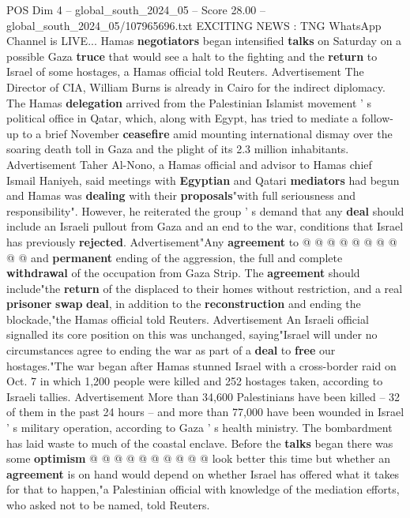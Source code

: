 \begin{textsample}{POS Dim 4 – global\_south\_2024\_05 – Score 28.00 – global\_south\_2024\_05/107965696.txt}  \label{ex:f4_pos_201}
EXCITING NEWS : TNG WhatsApp Channel is LIVE...
Hamas \textbf{negotiators} began intensified \textbf{talks} on Saturday on a possible Gaza \textbf{truce} that would see a halt to the fighting and the \textbf{return} to Israel of some hostages, a Hamas official told Reuters.
Advertisement The Director of CIA, William Burns is already in Cairo for the indirect diplomacy.
The Hamas \textbf{delegation} arrived from the Palestinian Islamist movement ' s political office in Qatar, which, along with Egypt, has tried to mediate a follow-up to a brief November \textbf{ceasefire} amid mounting international dismay over the soaring death toll in Gaza and the plight of its 2.3 million inhabitants.
Advertisement Taher Al-Nono, a Hamas official and advisor to Hamas chief Ismail Haniyeh, said meetings with \textbf{Egyptian} and Qatari \textbf{mediators} had begun and Hamas was \textbf{dealing} with their \textbf{proposals}"with full seriousness and responsibility".
However, he reiterated the group ' s demand that any \textbf{deal} should include an Israeli pullout from Gaza and an end to the war, conditions that Israel has previously \textbf{rejected}.
Advertisement"Any \textbf{agreement} to @ @ @ @ @ @ @ @ @ @ and \textbf{permanent} ending of the aggression, the full and complete \textbf{withdrawal} of the occupation from Gaza Strip.
The \textbf{agreement} should include"the \textbf{return} of the displaced to their homes without restriction, and a real \textbf{prisoner} \textbf{swap} \textbf{deal}, in addition to the \textbf{reconstruction} and ending the blockade,"the Hamas official told Reuters.
Advertisement An Israeli official signalled its core position on this was unchanged, saying"Israel will under no circumstances agree to ending the war as part of a \textbf{deal} to \textbf{free} our hostages."The war began after Hamas stunned Israel with a cross-border raid on Oct. 7 in which 1,200 people were killed and 252 hostages taken, according to Israeli tallies.
Advertisement More than 34,600 Palestinians have been killed -- 32 of them in the past 24 hours -- and more than 77,000 have been wounded in Israel ' s military operation, according to Gaza ' s health ministry.
The bombardment has laid waste to much of the coastal enclave.
Before the \textbf{talks} began there was some \textbf{optimism} @ @ @ @ @ @ @ @ @ @ look better this time but whether an \textbf{agreement} is on hand would depend on whether Israel has offered what it takes for that to happen,"a Palestinian official with knowledge of the mediation efforts, who asked not to be named, told Reuters.

\end{textsample}
